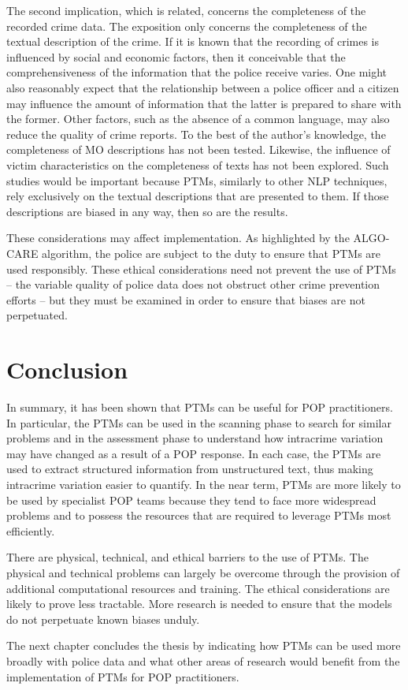 The second implication, which is related, concerns the completeness of the recorded crime data. The exposition only concerns the completeness of the textual description of the crime. If it is known that the recording of crimes is influenced by social and economic factors, then it conceivable that the comprehensiveness of the information that the police receive varies. One might also reasonably expect that the relationship between a police officer and a citizen may influence the amount of information that the latter is prepared to share with the former. Other factors, such as the absence of a common language, may also reduce the quality of crime reports. To the best of the author’s knowledge, the completeness of MO descriptions has not been tested. Likewise, the influence of victim characteristics on the completeness of texts has not been explored. Such studies would be important because PTMs, similarly to other NLP techniques, rely exclusively on the textual descriptions that are presented to them. If those descriptions are biased in any way, then so are the results.

These considerations may affect implementation. As highlighted by the ALGO-CARE algorithm, the police are subject to the duty to ensure that PTMs are used responsibly. These ethical considerations need not prevent the use of PTMs – the variable quality of police data does not obstruct other crime prevention efforts – but they must be examined in order to ensure that biases are not perpetuated.

\section{Conclusion} In summary, it has been shown that PTMs can be useful for POP practitioners. In particular, the PTMs can be used in the scanning phase to search for similar problems and in the assessment phase to understand how intracrime variation may have changed as a result of a POP response. In each case, the PTMs are used to extract structured information from unstructured text, thus making intracrime variation easier to quantify. In the near term, PTMs are more likely to be used by specialist POP teams because they tend to face more widespread problems and to possess the resources that are required to leverage PTMs most efficiently.

There are physical, technical, and ethical barriers to the use of PTMs. The physical and technical problems can largely be overcome through the provision of additional computational resources and training. The ethical considerations are likely to prove less tractable. More research is needed to ensure that the models do not perpetuate known biases unduly.

The next chapter concludes the thesis by indicating how PTMs can be used more broadly with police data and what other areas of research would benefit from the implementation of PTMs for POP practitioners.
